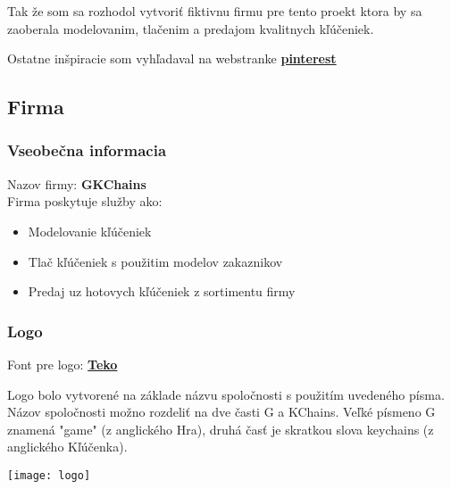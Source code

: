       Tak že som sa rozhodol vytvoriť fiktivnu firmu pre tento proekt ktora by sa zaoberala modelovanim, tlačenim a predajom kvalitnych kľúčeniek.

      Ostatne inšpiracie som vyhľadaval na webstranke \textbf{\href{https://pinterest.com}{pinterest}}

    \subsection{Firma}
      \subsubsection{Vseobečna informacia}
      Nazov firmy: \textbf{GKChains} \\
      Firma poskytuje služby ako:
      \begin{itemize}
        \item{Modelovanie kľúčeniek}
        \item{Tlač kľúčeniek s použitim modelov zakaznikov}
        \item{Predaj uz hotovych kľúčeniek z sortimentu firmy}
      \end{itemize}
      \subsubsection{Logo}
      Font pre logo: \textbf{\href{https://fonts.google.com/specimen/Teko?query=Teko}{Teko}}

      Logo bolo vytvorené na základe názvu spoločnosti s použitím uvedeného písma. Názov spoločnosti možno rozdeliť na dve časti G a KChains. Veľké písmeno G znamená "game" (z anglického Hra), druhá časť je skratkou slova keychains (z anglického Kľúčenka).

      \begin{center}
      \end{center}
      \texttt{[image: logo]}

